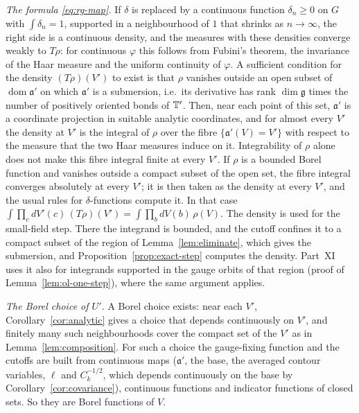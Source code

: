 \begin{remark*}
\emph{The formula \eqref{eq:rg-map}.} If $\delta$ is replaced by a continuous function $\delta_n\ge0$ on $G$ with $\int\delta_n=1$, supported in a neighbourhood of $1$ that shrinks as $n\to\infty$, the right side is a continuous density, and the measures with these densities converge weakly to $T\rho$: for continuous $\varphi$ this follows from Fubini's theorem, the invariance of the Haar measure and the uniform continuity of $\varphi$. A sufficient condition for the density $(T\rho)(V')$ to exist is that $\rho$ vanishes outside an open subset of $\operatorname{dom}\mathfrak a'$ on which $\mathfrak a'$ is a submersion, i.e.\ its derivative has rank $\dim\mathfrak g$ times the number of positively oriented bonds of $\mathbb T'$. Then, near each point of this set, $\mathfrak a'$ is a coordinate projection in suitable analytic coordinates, and for almost every $V'$ the density at $V'$ is the integral of $\rho$ over the fibre $\{\mathfrak a'(V)=V'\}$ with respect to the measure that the two Haar measures induce on it. Integrability of $\rho$ alone does not make this fibre integral finite at every $V'$. If $\rho$ is a bounded Borel function and vanishes outside a compact subset of the open set, the fibre integral converges absolutely at every $V'$; it is then taken as the density at every $V'$, and the usual rules for $\delta$-functions compute it. In that case $\int\prod_cdV'(c)\,(T\rho)(V')=\int\prod_bdV(b)\,\rho(V)$. The density is used for the small-field step. There the integrand is bounded, and the cutoff confines it to a compact subset of the region of Lemma~\ref{lem:eliminate}, which gives the submersion, and Proposition~\ref{prop:exact-step} computes the density. Part~XI uses it also for integrands supported in the gauge orbits of that region (proof of Lemma~\ref{lem:ol-one-step}), where the same argument applies.

\emph{The Borel choice of $U'$.} A Borel choice exists: near each $V'$, Corollary~\ref{cor:analytic} gives a choice that depends continuously on $V'$, and finitely many such neighbourhoods cover the compact set of the $V'$ as in Lemma~\ref{lem:composition}. For such a choice the gauge-fixing function and the cutoffs are built from continuous maps ($\mathfrak a'$, the base, the averaged contour variables, $\ell$ and $C_k^{-1/2}$, which depends continuously on the base by Corollary~\ref{cor:covariance}), continuous functions and indicator functions of closed sets. So they are Borel functions of $V$.
\end{remark*}

